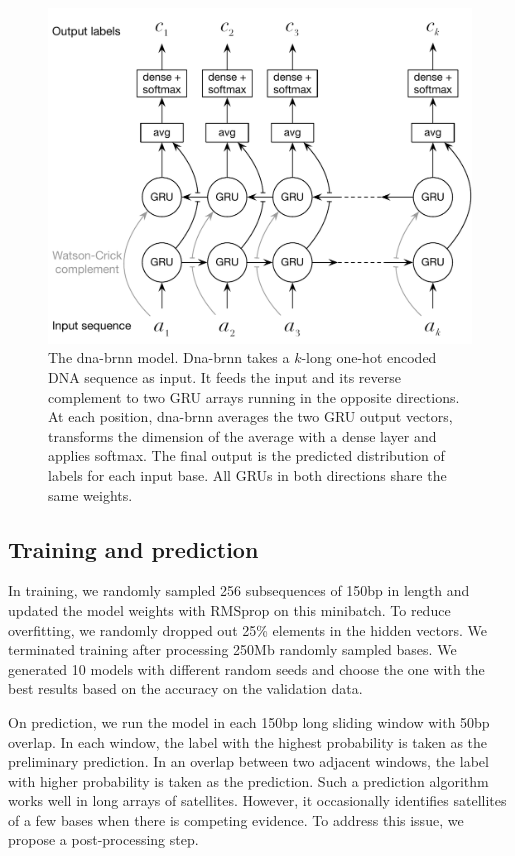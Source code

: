 \documentclass{bioinfo}
\begin{document}
\begin{methods}
\begin{figure}[tb]
\centering
\includegraphics[width=.45\textwidth]{dna-nn-fig}
\caption{The dna-brnn model. Dna-brnn takes a $k$-long one-hot encoded DNA
sequence as input. It feeds the input and its reverse complement to two GRU
arrays running in the opposite directions. At each
position, dna-brnn averages the two GRU output vectors, transforms the
dimension of the average with a dense layer and applies softmax. The final
output is the predicted distribution of labels for each input base. All GRUs in
both directions share the same weights.}\label{fig:model}
\end{figure}

\subsection{Training and prediction}

In training, we randomly sampled 256 subsequences of 150bp in length and updated
the model weights with RMSprop on this minibatch. To reduce overfitting, we
randomly dropped out 25\% elements in the hidden vectors. We terminated
training after processing 250Mb randomly sampled bases. We generated 10 models
with different random seeds and choose the one with the best results based on
the accuracy on the validation data.

On prediction, we run the model in each 150bp long sliding window with 50bp
overlap. In each window, the label with the highest probability is taken as the
preliminary prediction. In an overlap between two adjacent windows, the label
with higher probability is taken as the prediction. Such a prediction
algorithm works well in long arrays of satellites. However, it occasionally
identifies satellites of a few bases when there is competing evidence. To
address this issue, we propose a post-processing step.


\end{methods}
\end{document}
